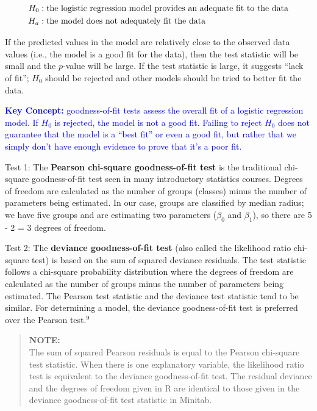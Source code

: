 \documentclass[
]{report}
\begin{document}
\begin{align}
H_0:\;&\text{the logistic regression model provides an adequate fit to the data} \notag \\
H_a:\;&\text{the model does not adequately fit the data} \notag
\end{align}

If the predicted values in the model are relatively close to the observed data values (i.e., the model is a good fit for the data), then the test statistic will be small and the \(\scriptstyle p\)-value will be large. If the test statistic is large, it suggests ``lack of fit''; \(\scriptstyle H_0\) should be rejected and other models should be tried to better fit the data.

\textbf{\textcolor{blue}{Key Concept:}}
\textcolor{blue}{goodness-of-fit tests assess the overall fit of a logistic regression model. If $\scriptstyle H_0$ is rejected, the model is not a good fit. Failing to reject $\scriptstyle H_0$ does not guarantee that the model is a “best fit” or even a good fit, but rather that we simply don’t have enough evidence to prove that it’s a poor fit.}

Test 1: The \textbf{Pearson chi-square goodness-of-fit test} is the traditional chi-square goodness-of-fit test seen in many introductory statistics courses. Degrees of freedom are calculated as the number of groups (classes) minus the number of parameters being estimated. In our case, groups are classified by median radius; we have five groups and are estimating two parameters (\(\scriptstyle \beta_0\) and \(\scriptstyle \beta_1\)), so there are 5 - 2 = 3 degrees of freedom.

Test 2: The \textbf{deviance goodness-of-fit test} (also called the likelihood ratio chi-square test) is based on the sum of squared deviance residuals. The test statistic follows a chi-square probability distribution where the degrees of freedom are calculated as the number of groups minus the number of parameters being estimated. The Pearson test statistic and the deviance test statistic tend to be similar. For determining a model, the deviance goodness-of-fit test is preferred over the Pearson test.\(^9\)

\begin{quote}
\textbf{NOTE:}\\
The sum of squared Pearson residuals is equal to the Pearson chi-square test statistic. When there is one explanatory variable, the likelihood ratio test is equivalent to the deviance goodness-of-fit test. The residual deviance and the degrees of freedom given in R are identical to those given in the deviance goodness-of-fit test statistic in Minitab.
\end{quote}
\end{document}
